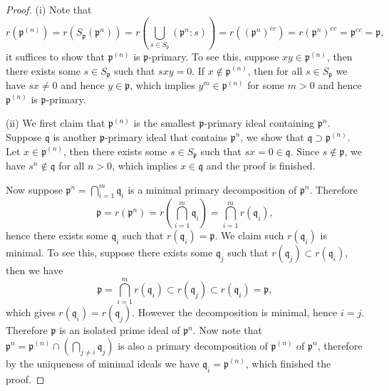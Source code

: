 \begin{proof}
(i) Note that 
$$
r\left( \mathfrak{p} ^{\left( n \right)} \right) =r\left( S_{\mathfrak{p}}\left( \mathfrak{p} ^n \right) \right) =r\left( \bigcup_{s\in S_{\mathfrak{p}}}{\left( \mathfrak{p} ^n:s \right)} \right) =r\left( \left( \mathfrak{p} ^n \right) ^{ec} \right) =r\left( \mathfrak{p} ^n \right) ^{ec}=\mathfrak{p} ^{ec}=\mathfrak{p} ,
$$
it suffices to show that $\mathfrak{p}^{(n)}$ is $\mathfrak{p}$-primary. To see this, suppose $xy\in\mathfrak{p}^{(n)}$, then there exists some $s\in S_\mathfrak{p}$ such that $sxy=0$. If $x\notin\mathfrak{p}^{(n)}$, then for all $s\in S_\mathfrak{p}$ we have $sx\ne 0$ and hence $y\in\mathfrak{p}$, which implies $y^m\in\mathfrak{p}^{(n)}$ for some $m>0$ and hence $\mathfrak{p}^{(n)}$ is $\mathfrak{p}$-primary.\par
(ii) We first claim that $\mathfrak{p}^{(n)}$ is the smallest $\mathfrak{p}$-primary ideal containing $\mathfrak{p}^n$. Suppose $\mathfrak{q}$ is another $\mathfrak{p}$-primary ideal that contains $\mathfrak{p}^n$, we show that $\mathfrak{q}\supset\mathfrak{p}^{(n)}$. Let $x\in\mathfrak{p}^{(n)}$, then there exists some $s\in S_\mathfrak{p}$ such that $sx=0\in\mathfrak{q}$. Since $s\notin\mathfrak{p}$, we have $s^n\notin\mathfrak{q}$ for all $n>0$, which implies $x\in\mathfrak{q}$ and the proof is finished.\par
Now suppose $\mathfrak{p}^n=\bigcap_{i=1}^m\mathfrak{q}_i$ is a minimal primary decomposition of $\mathfrak{p}^n$. Therefore 
$$
\mathfrak{p} =r\left( \mathfrak{p} ^n \right) =r\left( \bigcap_{i=1}^m{\mathfrak{q} _i} \right) =\bigcap_{i=1}^m{r\left( \mathfrak{q} _i \right)},
$$
hence there exists some $\mathfrak{q}_i$ such that $r(\mathfrak{q}_i)=\mathfrak{p}$. We claim such $r(\mathfrak{q}_i)$ is minimal. To see this, suppose there exists some $\mathfrak{q}_j$ such that $r(\mathfrak{q}_j)\subset r(\mathfrak{q}_i)$, then we have 
$$
\mathfrak{p} =\bigcap_{i=1}^m{r\left( \mathfrak{q} _i \right)}\subset r\left( \mathfrak{q} _j \right) \subset r\left( \mathfrak{q} _i \right) =\mathfrak{p} ,
$$
which gives $r(\mathfrak{q}_i)=r(\mathfrak{q}_j)$. However the decomposition is minimal, hence $i=j$. Therefore $\mathfrak{p}$ is an isolated prime ideal of $\mathfrak{p}^n$. Now note that $\mathfrak{p} ^n=\mathfrak{p} ^{\left( n \right)}\cap \left( \bigcap_{j\ne i}{\mathfrak{q} _j} \right) $ is also a primary decomposition of $\mathfrak{p}^{(n)}$ of $\mathfrak{p}^n$, therefore by the uniqueness of minimal ideals we have $\mathfrak{q}_i=\mathfrak{p}^{(n)}$, which finished the proof.\par

\end{proof}
